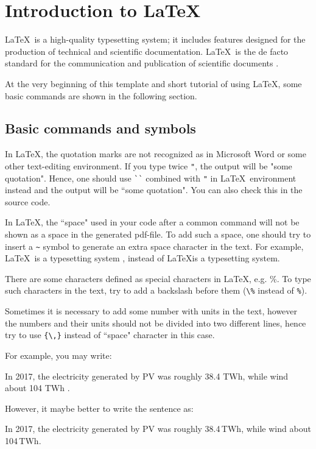 \chapter{Introduction to \LaTeX}

\LaTeX~is a high-quality typesetting system; it includes features designed for the production of technical and scientific documentation. \LaTeX~is the de facto standard for the communication and publication of scientific documents \cite{LaTeX3Team.}.

At the very beginning of this template and short tutorial of using \LaTeX, some basic commands are shown in the following section.

\section{Basic commands and symbols}
	
	In \LaTeX, the quotation marks are not recognized as in Microsoft Word or some other text-editing environment. If you type twice {\verb|"|}, the output will be "some quotation". Hence, one should use {\verb|``|} combined with {\verb|"|} in \LaTeX~environment instead and the output will be ``some quotation". You can also check this in the source code.
	
	In \LaTeX, the ``space" used in your code after a common command will not be shown as a space in the generated pdf-file. To add such a space, one should try to insert a {\verb|~|} symbol to generate an extra space character in the text. For example, \LaTeX~is a typesetting system , instead of \LaTeX is a typesetting system.
	
	There are some characters defined as special characters in \LaTeX, e.g. \%. To type such characters in the text, try to add a backslash before them ({\verb|\%|} instead of {\verb|%|}).
	
	Sometimes it is necessary to add some number with units in the text, however the numbers and their units should not be divided into two different lines, hence try to use {\verb|{\,}|} instead of ``space" character in this case.
	
	For example, you may write:
	
	In 2017, the electricity generated by \acrshort{PV} was roughly 38.4 TWh, while wind about 104 TWh \cite{Burger.20180508}.
	
	However, it maybe better to write the sentence as:
	
	In 2017, the electricity generated by \acrshort{PV} was roughly 38.4{\,}TWh, while wind about 104{\,}TWh.
	
	
